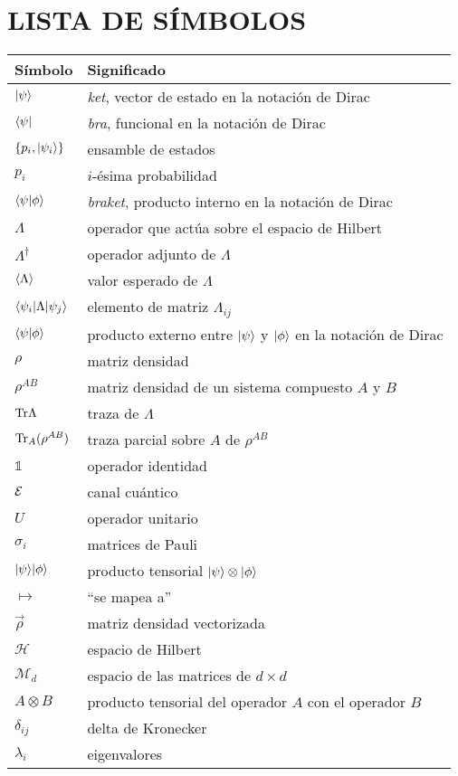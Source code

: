 


\chapter*{LISTA DE SÍMBOLOS} 

\begin{longtable}{@{}l@{\extracolsep{\fill}} p{4.75in} @{}}  %
  \textsf{Símbolo} & \textsf{Significado}\\[12pt]
  \endhead{}
 $|\psi\rangle$ &  \textit{ket}, vector de estado en la notación de Dirac \\
  $\langle\psi|$ & \textit{bra}, funcional en la notación de Dirac\\
  $\{p_i,|\psi_i\rangle\}$ & ensamble de estados \\
  $p_i$ & $i$-ésima probabilidad\\
  $\langle\psi|\phi\rangle$ & \textit{braket}, producto interno en la notación de Dirac\\
  $\Lambda$ &  operador que actúa sobre el espacio de Hilbert\\
  $\Lambda^{\dagger}$ & operador adjunto de $\Lambda$\\
  $\langle{\Lambda}\rangle$ & valor esperado de $\Lambda$\\
  $\langle\psi_i|\Lambda|\psi_j\rangle$ & elemento de matriz $\Lambda_{ij}$\\
  $\langle \psi|\phi \rangle $ & producto externo entre $|\psi\rangle$ y $|\phi\rangle$ en la notación de Dirac \\
  $\rho$ & matriz densidad\\
  $\rho^{AB}$ & matriz densidad de un sistema compuesto $A$ y $B$\\
  ${\rm Tr} \Lambda$ & traza de $\Lambda$\\
  ${\rm Tr}_{A}(\rho^{AB})$ & traza parcial sobre $A$ de $\rho^{AB}$\\
  $\mathds{1}$ & operador identidad \\
  $\mathcal{E}$ & canal cuántico \\
  $U$ & operador unitario \\
  $\sigma_i$ & matrices de Pauli\\
  $| \psi\rangle|\phi\rangle$ & producto tensorial $|\psi\rangle\otimes|\phi\rangle$\\
  $\mapsto$ & ``se mapea a''\\
  $\vec\rho$ & matriz densidad vectorizada\\
  $\mathcal{H}$ & espacio de Hilbert\\
  $\mathcal{M}_d$ & espacio de las matrices de $d\times d$\\
  $A{\otimes} B$  & producto tensorial del operador $A$ con el operador $B$\\
  $\delta_{ij}$ & delta de Kronecker\\
 $\lambda_i$ & eigenvalores
\end{longtable}
